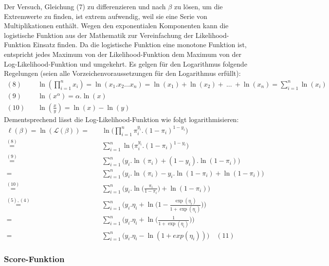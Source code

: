 \documentclass[12pt,]{article}
\begin{document}
Der Versuch, Gleichung (7) zu differenzieren und nach \(\beta\) zu
lösen, um die Extremwerte zu finden, ist extrem aufwendig, weil sie eine
Serie von Multiplikationen enthält. Wegen den exponentialen Komponenten
kann die logistische Funktion aus der Mathematik zur Vereinfachung der
Likelihood-Funktion Einsatz finden. Da die logistische Funktion eine
monotone Funktion ist, entspricht jedes Maximum von der
Likelihood-Funktion dem Maximum von der Log-Likelihood-Funktion und
umgekehrt. Es gelgen für den Logarithmus folgende Regelungen (seien alle
Vorzeichenvoraussetzungen für den Logarithmus erfüllt): \[
\begin{aligned}
(8) \quad &\ln(\prod_{i=1}^{n}x_i) = \ln(x_1.x_2...x_n) = \ln(x_1) + \ln(x_2) + \ ... \ + \ln(x_n) = \sum_{i=1}^{n} \ln(x_i) \\
(9) \quad &\ln(x^\alpha) = \alpha.\ln(x) \\
(10) \quad &\ln(\frac{x}{y}) = \ln(x) - \ln(y)
\end{aligned} 
\] Dementsprechend lässt die Log-Likelihood-Funktion wie folgt
logarithmisieren: \[
\begin{aligned}
\ell(\beta) = \ln(\mathcal{L}(\beta)) = \quad &\ln \Bigg( \prod_{i=1}^{n} \pi_i^{y_i}.(1-\pi_i)^{1-y_i} \Bigg) \\
\mathrel{\overset{(8)}{=}} \quad &\sum_{i = 1}^{n} \ln \Big(\pi_i^{y_i}.(1-\pi_i)^{1-y_i}\Big) \\
\mathrel{\overset{(9)}{=}} \quad &\sum_{i = 1}^{n} \Big( y_i.\ln(\pi_i) + (1-y_i).\ln(1-\pi_i) \Big) \\
= \quad &\sum_{i = 1}^{n} \Big( y_i.\ln(\pi_i) - y_i.\ln(1-\pi_i) + \ln(1-\pi_i) \Big) \\
\mathrel{\overset{(10)}{=}} \quad &\sum_{i = 1}^{n} \Bigg( y_i.\ln \Big(\frac{\pi_i}{1-\pi_i}\Big) + \ln(1-\pi_i) \Bigg) \\
\mathrel{\overset{(5),(4)}{=}} \ &\sum_{i = 1}^{n} \Bigg( y_i.\eta_i + \ln \Big( 1- \frac{\exp(\eta_i)}{1 + \exp(\eta_i)} \Big) \Bigg) \\
= \quad &\sum_{i = 1}^{n} \Bigg( y_i.\eta_i + \ln \Big( \frac{1}{1+\exp(\eta_i)}\Big) \Bigg) \\
= \quad &\sum_{i = 1}^{n} \Big( y_i.\eta_i - \ln (1 + exp(\eta_i)) \Big) \quad (11)
\end{aligned}
\]

\subsubsection{Score-Funktion}\label{score-funktion}
\end{document}
